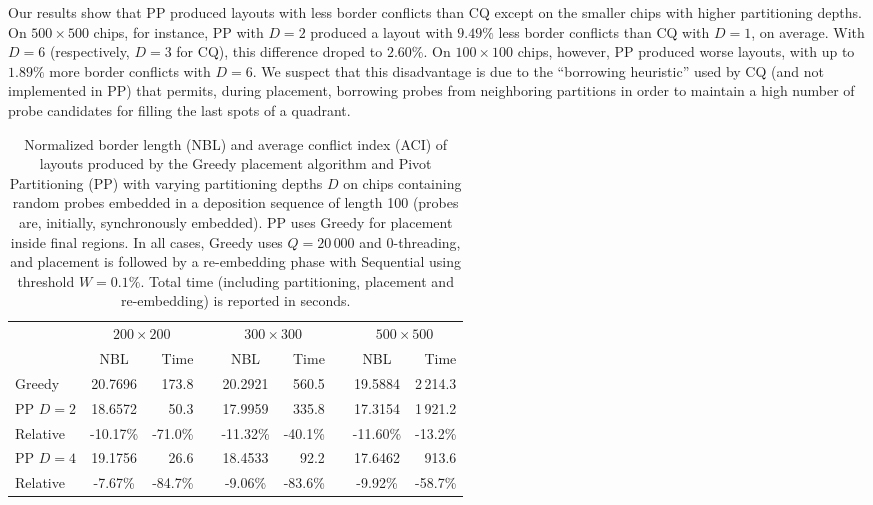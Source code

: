 Our results show that PP produced layouts with less border conflicts than CQ
except on the smaller chips with higher partitioning depths. On $500\times 500$
chips, for instance, PP with $D=2$ produced a layout with $9.49\%$ less border
conflicts than CQ with $D=1$, on average. With $D=6$ (respectively, $D=3$ for
CQ), this difference droped to $2.60\%$. On $100\times 100$ chips, however, PP
produced worse layouts, with up to $1.89\%$ more border conflicts with $D=6$.
We suspect that this disadvantage is due to the ``borrowing heuristic'' used by
CQ (and not implemented in PP) that permits, during placement, borrowing probes
from neighboring partitions in order to maintain a high number of probe
candidates for filling the last spots of a quadrant.

\begin{table}[t!]\centering
\caption{\label{tab:pp_sync}
  Normalized border length (NBL) and average conflict index (ACI) of layouts
  produced by the Greedy placement algorithm and Pivot Partitioning (PP) with
  varying partitioning depths $D$ on chips containing random probes embedded in
  a deposition sequence of length 100 (probes are, initially, synchronously
  embedded). PP uses Greedy for placement inside final regions. In all cases,
  Greedy uses $Q=20\,000$ and $0$-threading, and placement is followed by a
  re-embedding phase with Sequential using threshold $W=0.1\%$. Total time
  (including partitioning, placement and re-embedding) is reported in seconds.}
\footnotesize{
\begin{tabular}{lcrlcrlcr}
\vspace{1pt}
 & \multicolumn{2}{c}{$200\times 200$} & & \multicolumn{2}{c}{$300\times 300$} & & \multicolumn{2}{c}{$500\times 500$} \\
\cline{2-3} \cline{5-6} \cline{8-9}
\vspace{1pt}
         & NBL      & Time    & & NBL      & Time    & & NBL      & Time       \\
\hline
Greedy   &  20.7696 & 173.8   & &  20.2921 & 560.5   & &  19.5884 & 2\,214.3   \\
\hline
PP $D=2$ &  18.6572 &  50.3   & &  17.9959 & 335.8   & &  17.3154 & 1\,921.2   \\
Relative & -10.17\% & -71.0\% & & -11.32\% & -40.1\% & & -11.60\% &    -13.2\% \\
\hline
PP $D=4$ &  19.1756 &  26.6   & &  18.4533 &  92.2   & &  17.6462 &    913.6   \\
Relative &  -7.67\% & -84.7\% & &  -9.06\% & -83.6\% & &  -9.92\% &    -58.7\% \\

\end{tabular}}
\end{table}

